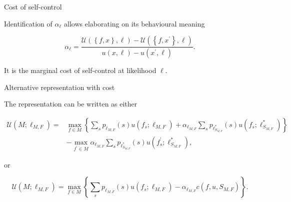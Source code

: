 \documentclass[usenames,dvipsnames,aspectratio=169,11pt, envcountsect, handout]{beamer}
\begin{document}
\begin{frame}{Cost of self-control}\label{alpha}

	Identification of \( \alpha_{\ell} \) allows elaborating on its behavioural meaning

	\vfill

	\[
		\alpha_{\ell} = \frac{\mathcal{U} \left( \left\{f, x \right\}, \ell \right) - \mathcal{U} \left( \left\{f, x^{\prime} \right\}, \ell \right) }{u \left( x , \ell \right) - u \left( x^{\prime} , \ell \right)} .
	\]

	\vfill

	It is the marginal cost of self-control at likelihood \( \ell \). \hyperlink{fullmodel}{}

\end{frame}

\begin{frame}{Alternative representation with cost}\label{cost}

	The representation can be written as either

	\[
		\begin{aligned}
			\mathcal{U} \left(M ; \ell_{M, F} \right) = & \max _{f \in M}\left\{\sum_{s} p_{\ell_{M, F}} \left( s \right) u \left( f_{s} ; \ell_{M, F} \right) +\alpha _{\ell_{M, F}} \sum_{s} p_{\ell^{*}_{S_{M, F}}} \left( s \right) u \left( f_{s} ; \ell^{*}_{S_{M, F}} \right) \right\} \\
			                                            & -\max _{f^{\prime} \in M} \alpha _{\ell_{M, F}} \sum_{s} p_{\ell^{*}_{S_{M, F}}} \left( s \right) u\left(f^{\prime}_{s} ; \ell^{*}_{S_{M, F}} \right) ,
		\end{aligned}
	\]

	or

	\[
		\mathcal{U} \left(M ; \ell_{M, F} \right) = \max _{f \in M}\left\{\sum_{s} p_{\ell_{M, F}} \left( s \right) u \left( f_{s} ; \ell_{M, F} \right) - \alpha_{\ell_{M, F}} c \left( f, u, S_{M,F} \right) \right\} .
	\]

	\begin{flushright}
		\hyperlink{fullmodel}{}
	\end{flushright}

\end{frame}
\end{document}
